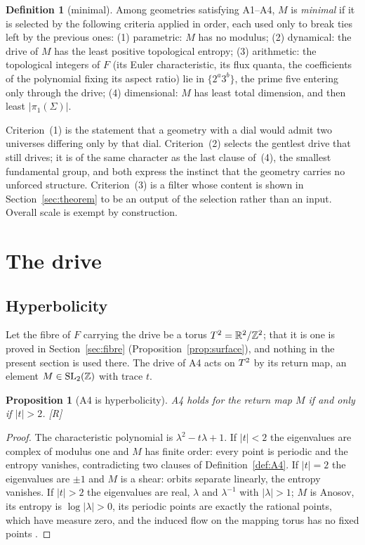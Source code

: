 \documentclass[11pt,a4paper]{article}
\theoremstyle{plain}
\newtheorem{proposition}[theorem]{Proposition}
\theoremstyle{definition}
\newtheorem{definition}[theorem]{Definition}
\theoremstyle{remark}
\newcommand{\rigR}{[\textup{R}]}
\begin{document}
\begin{definition}[minimal]\label{def:minimal}
Among geometries satisfying A1--A4, $M$ is \emph{minimal} if it is selected by the following criteria applied in order, each used only to break ties left by the previous ones: (1) parametric: $M$ has no modulus; (2) dynamical: the drive of $M$ has the least positive topological entropy; (3) arithmetic: the topological integers of $F$ (its Euler characteristic, its flux quanta, the coefficients of the polynomial fixing its aspect ratio) lie in $\{2^{a}3^{b}\}$, the prime five entering only through the drive; (4) dimensional: $M$ has least total dimension, and then least $\lvert\pi_{1}(\Sigma)\rvert$.
\end{definition}

Criterion~(1) is the statement that a geometry with a dial would admit two universes differing only by that dial. Criterion~(2) selects the gentlest drive that still drives; it is of the same character as the last clause of~(4), the smallest fundamental group, and both express the instinct that the geometry carries no unforced structure. Criterion~(3) is a filter whose content is shown in Section~\ref{sec:theorem} to be an output of the selection rather than an input. Overall scale is exempt by construction.

\section{The drive}\label{sec:drive}

\subsection{Hyperbolicity}

Let the fibre of $F$ carrying the drive be a torus $T^2=\mathbb{R}^{2}/\mathbb{Z}^{2}$; that it is one is proved in Section~\ref{sec:fibre} (Proposition~\ref{prop:surface}), and nothing in the present section is used there. The drive of A4 acts on $T^2$ by its return map, an element $M\in\mathrm{SL}_{2}(\mathbb{Z})$ with trace $t$.

\begin{proposition}[A4 is hyperbolicity]\label{prop:hyp}
A4 holds for the return map $M$ if and only if $\lvert t\rvert>2$. \rigR
\end{proposition}

\begin{proof}
The characteristic polynomial is $\lambda^{2}-t\lambda+1$. If $\lvert t\rvert<2$ the eigenvalues are complex of modulus one and $M$ has finite order: every point is periodic and the entropy vanishes, contradicting two clauses of Definition~\ref{def:A4}. If $\lvert t\rvert=2$ the eigenvalues are $\pm1$ and $M$ is a shear: orbits separate linearly, the entropy vanishes. If $\lvert t\rvert>2$ the eigenvalues are real, $\lambda$ and $\lambda^{-1}$ with $\lvert\lambda\rvert>1$; $M$ is Anosov, its entropy is $\log\lvert\lambda\rvert>0$, its periodic points are exactly the rational points, which have measure zero, and the induced flow on the mapping torus has no fixed points \cite{KatokHasselblatt}.
\end{proof}
\end{document}
